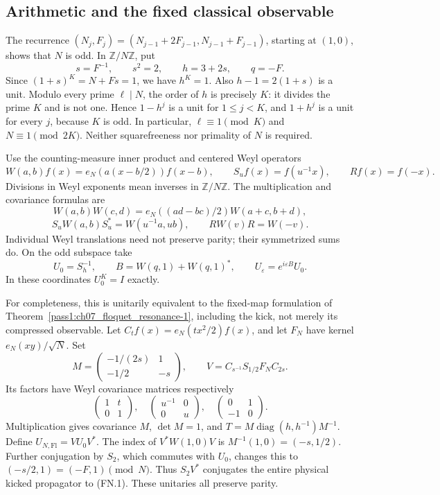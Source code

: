 \subsection{Arithmetic and the fixed classical observable}\label{floquet:arithmetic-and-the-fixed-classical-observable}

The recurrence \((N_j,F_j)=(N_{j-1}+2F_{j-1},N_{j-1}+F_{j-1})\), starting at \((1,0)\), shows that \(N\) is odd. In \(\mathbb Z/N\mathbb Z\), put \[
 s=F^{-1},\qquad s^2=2,\qquad h=3+2s,\qquad q=-F.
\] Since \((1+s)^K=N+Fs=1\), we have \(h^K=1\). Also \(h-1=2(1+s)\) is a unit. Modulo every prime \(\ell\mid N\), the order of \(h\) is precisely \(K\): it divides the prime \(K\) and is not one. Hence \(1-h^j\) is a unit for \(1\leq j<K\), and \(1+h^j\) is a unit for every \(j\), because \(K\) is odd. In particular, \(\ell\equiv1\pmod K\) and \(N\equiv1\pmod{2K}\). Neither squarefreeness nor primality of \(N\) is required.

Use the counting-measure inner product and centered Weyl operators \[
 W(a,b)f(x)=e_N(a(x-b/2))f(x-b),\qquad
 S_u f(x)=f(u^{-1}x),\qquad Rf(x)=f(-x).
\] Divisions in Weyl exponents mean inverses in \(\mathbb Z/N\mathbb Z\). The multiplication and covariance formulas are \[
 W(a,b)W(c,d)=e_N((ad-bc)/2)W(a+c,b+d),
\] \[
 S_uW(a,b)S_u^*=W(u^{-1}a,ub),\qquad RW(v)R=W(-v).
\] Individual Weyl translations need not preserve parity; their symmetrized sums do. On the odd subspace take \[
 U_0=S_h^{-1},\qquad B=W(q,1)+W(q,1)^*,\qquad
 U_\varepsilon=e^{i\varepsilon B}U_0.                            \tag{FN.1}
\] In these coordinates \(U_0^K=I\) exactly.

For completeness, this is unitarily equivalent to the fixed-map formulation of Theorem~\ref{pass1:ch07_floquet_resonance-1}, including the kick, not merely its compressed observable. Let \(C_tf(x)=e_N(tx^2/2)f(x)\), and let \(F_N\) have kernel \(e_N(xy)/\sqrt N\). Set \[
 M=\begin{pmatrix}-1/(2s)&1\\-1/2&-s\end{pmatrix},\qquad
 V=C_{s^{-1}}S_{1/2}F_N C_{2s}.
\] Its factors have Weyl covariance matrices respectively \[
 \begin{pmatrix}1&t\\0&1\end{pmatrix},\quad
 \begin{pmatrix}u^{-1}&0\\0&u\end{pmatrix},\quad
 \begin{pmatrix}0&1\\-1&0\end{pmatrix}.
\] Multiplication gives covariance \(M\), \(\det M=1\), and \(T=M\operatorname{diag}(h,h^{-1})M^{-1}\). Define \(U_{N,\mathrm{Fl}}=VU_0V^*\). The index of \(V^*W(1,0)V\) is \(M^{-1}(1,0)=(-s,1/2)\). Further conjugation by \(S_2\), which commutes with \(U_0\), changes this to \((-s/2,1)=(-F,1)\pmod N\). Thus \(S_2V^*\) conjugates the entire physical kicked propagator to (FN.1). These unitaries all preserve parity.

